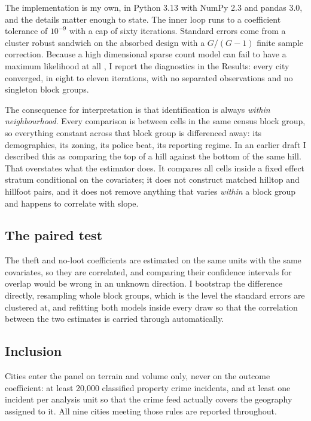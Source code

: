 \documentclass[11pt,letterpaper]{article}
\begin{document}
The implementation is my own, in Python 3.13 with NumPy 2.3 and pandas 3.0, and the
details matter enough to state. The inner loop runs to a coefficient tolerance of
$10^{-9}$ with a cap of sixty iterations. Standard errors come from a cluster robust
sandwich on the absorbed design with a $G/(G-1)$ finite sample correction. Because a
high dimensional sparse count model can fail to have a maximum likelihood at all
\cite{correia2020}, I report the diagnostics in the Results: every city converged,
in eight to eleven iterations, with no separated observations and no singleton block
groups.

The consequence for interpretation is that identification is always \emph{within
neighbourhood}. Every comparison is between cells in the same census block group, so
everything constant across that block group is differenced away: its demographics,
its zoning, its police beat, its reporting regime. In an earlier draft I described
this as comparing the top of a hill against the bottom of the same hill. That
overstates what the estimator does. It compares all cells inside a fixed effect
stratum conditional on the covariates; it does not construct matched hilltop and
hillfoot pairs, and it does not remove anything that varies \emph{within} a block
group and happens to correlate with slope.

\subsection{The paired test}

The theft and no-loot coefficients are estimated on the same units with the same
covariates, so they are correlated, and comparing their confidence intervals for
overlap would be wrong in an unknown direction. I bootstrap the difference directly,
resampling whole block groups, which is the level the standard errors are clustered
at, and refitting both models inside every draw so that the correlation between the
two estimates is carried through automatically.

\subsection{Inclusion}

Cities enter the panel on terrain and volume only, never on the outcome coefficient:
at least 20,000 classified property crime incidents, and at least one incident per
analysis unit so that the crime feed actually covers the geography assigned to it.
All nine cities meeting those rules are reported throughout.
\end{document}
